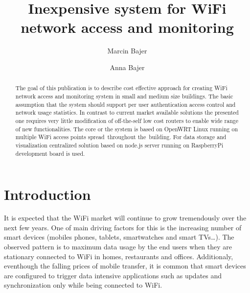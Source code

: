 \documentclass{llncs}
\begin{document}
%
\frontmatter          %
%
\pagestyle{headings}  %
%
\mainmatter              %
%
\title{Inexpensive system for WiFi network access and monitoring}

\author{Marcin Bajer \and Anna Bajer}
%
%
%

\maketitle              %

\begin{abstract}
The goal of this publication is to describe cost effective approach for creating WiFi network access 
and monitoring system in small and medium size buildings. The basic assumption that the system should 
support per user authentication access control and network usage statistics. 
In contrast to current market available solutions the presented one requires very little modification of off-the-self 
low cost routers to enable wide range of new functionalities. The core or the
system is based on OpenWRT Linux running on multiple WiFi access points spread throughout the building. 
For data storage and visualization centralized solution 
based on node.js server running on RaspberryPi development board is used.
\end{abstract}
%
\section{Introduction}
%

It is expected that the WiFi market will continue to grow tremendously over the
next few years. One of main driving factors for this is the increasing number of
smart devices (mobiles phones, tablets, smartwatches and smart TVs\ldots). The
observed pattern is to maximum data usage by the end users when they are
stationary connected to WiFi in homes, restaurants and offices.
Additionaly, eventhough the falling prices of mobile transfer, it is common that
smart devices are configured to trigger data intensive applications such as
updates and synchronization only while being connected to WiFi.
\end{document}
